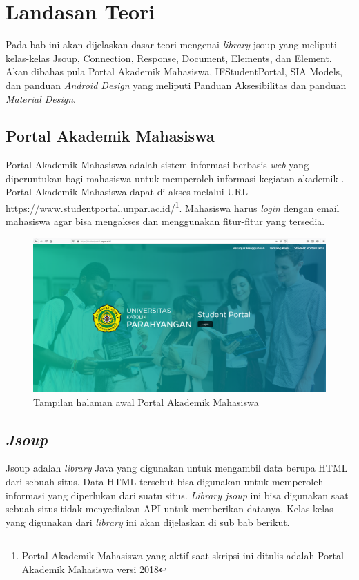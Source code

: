 \chapter{Landasan Teori}
\label{chap:teori}

Pada bab ini akan dijelaskan dasar teori mengenai \textit{library} jsoup yang meliputi kelas-kelas Jsoup, Connection, Response, Document, Elements, dan Element. Akan dibahas pula Portal Akademik Mahasiswa, IFStudentPortal, SIA Models, dan panduan \textit{Android Design} yang meliputi Panduan Aksesibilitas dan panduan \textit{Material Design}.

\section{Portal Akademik Mahasiswa}
Portal Akademik Mahasiswa adalah sistem informasi berbasis \textit{web} yang diperuntukan bagi mahasiswa untuk memperoleh informasi kegiatan akademik \cite{studentportalunpar}. Portal Akademik Mahasiswa dapat di akses melalui URL \url{https://www.studentportal.unpar.ac.id/}\footnote{Portal Akademik Mahasiswa yang aktif saat skripsi ini ditulis adalah Portal Akademik Mahasiswa versi 2018}. Mahasiswa harus \textit{login} dengan email mahasiswa agar bisa mengakses dan menggunakan fitur-fitur yang tersedia.     

\begin{figure}[H]
	\centering
	\includegraphics[scale=0.3]{DokumenSkripsi/Gambar/stupor.PNG}
	\caption{Tampilan halaman awal Portal Akademik Mahasiswa} 
	\label{fig:studpor_home}
\end{figure}
			

\section{\textit{Jsoup}}
\label{sec:jsoup}
Jsoup adalah \textit{library} Java yang digunakan untuk mengambil data berupa HTML dari sebuah situs. Data HTML tersebut bisa digunakan untuk memperoleh informasi yang diperlukan dari suatu situs\cite{jsoup}. \textit{Library jsoup} ini bisa digunakan saat sebuah situs tidak menyediakan API untuk memberikan datanya. Kelas-kelas yang digunakan dari \textit{library} ini akan dijelaskan di sub bab berikut.


